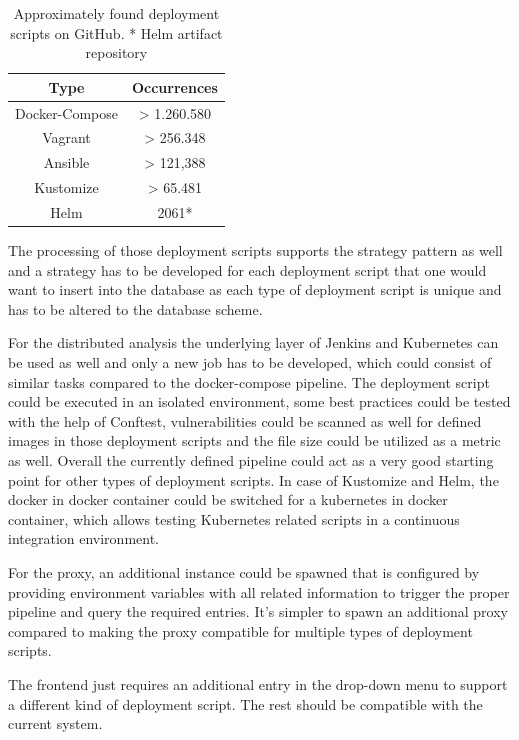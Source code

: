\begin{table}[h!]
    \centering
    \begin{tabular}{ |c|c| }
    \hline
    Type & Occurrences \\
    \hline
         Docker-Compose & > 1.260.580 \\
         Vagrant & > 256.348\\
         Ansible & > 121,388\\
         Kustomize & > 65.481\\
         Helm & 2061*\\
    \hline
    \end{tabular}
    \caption{Approximately found deployment scripts on GitHub. * Helm artifact repository}
    \label{deployment_script_occurrences}
\end{table}

The processing of those deployment scripts supports the strategy pattern as well and a strategy has to be developed for each deployment script that one would want to insert into the database as each type of deployment script is unique and has to be altered to the database scheme.

For the distributed analysis the underlying layer of Jenkins and Kubernetes can be used as well and only a new job has to be developed, which could consist of similar tasks compared to the docker-compose pipeline. The deployment script could be executed in an isolated environment, some best practices could be tested with the help of Conftest, vulnerabilities could be scanned as well for defined images in those deployment scripts and the file size could be utilized as a metric as well. Overall the currently defined pipeline could act as a very good starting point for other types of deployment scripts. In case of Kustomize and Helm, the docker in docker container could be switched for a kubernetes in docker container, which allows testing Kubernetes related scripts in a continuous integration environment.

For the proxy, an additional instance could be spawned that is configured by providing environment variables with all related information to trigger the proper pipeline and query the required entries. It's simpler to spawn an additional proxy compared to making the proxy compatible for multiple types of deployment scripts.

The frontend just requires an additional entry in the drop-down menu to support a different kind of deployment script. The rest should be compatible with the current system.

